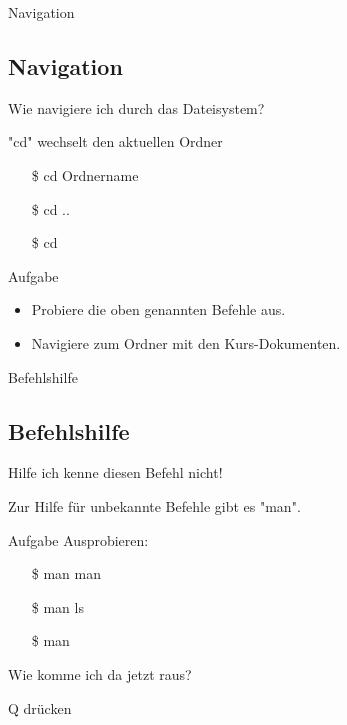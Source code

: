 \begin{frame}{Navigation}
    \subsection{Navigation}\label{subsec:navigation}

    Wie navigiere ich durch das Dateisystem?
    \pause

    \textrightarrow "cd" wechselt den aktuellen Ordner
    \pause

    \begin{itemize}
        \item[\$] cd Ordnername\pause
        \item[\$] cd ..\pause
        \item[\$] cd
    \end{itemize}
    \pause

    \vspace{0.5cm}
    \begin{alertblock}{Aufgabe}
        \begin{itemize}
            \item Probiere die oben genannten Befehle aus.\pause
            \item Navigiere zum Ordner mit den Kurs-Dokumenten.
        \end{itemize}
    \end{alertblock}

\end{frame}

\begin{frame}{Befehlshilfe}
    \subsection{Befehlshilfe}\label{subsec:befehlshilfe}

    Hilfe ich kenne diesen Befehl nicht!
    \pause

    \textrightarrow Zur Hilfe für unbekannte Befehle gibt es "man".
    \pause

    \vspace{0.5cm}
    \begin{alertblock}{Aufgabe}
        Ausprobieren:

        \begin{itemize}
            \item[\$] man man\pause
            \item[\$] man ls\pause
            \item[\$] man
        \end{itemize}
    \end{alertblock}
    \pause

    Wie komme ich da jetzt raus?
    \pause

    \textrightarrow Q drücken

\end{frame}

